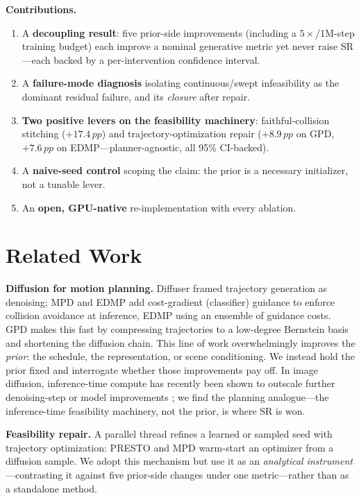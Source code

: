 \documentclass[10pt,twocolumn]{article}
\newcommand{\pp}{\,pp}
\begin{document}
\noindent\textbf{Contributions.}
\begin{enumerate}\itemsep2pt
\item A \textbf{decoupling result}: five prior-side improvements (including a
  $5\times$/1M-step training budget) each improve a nominal generative metric yet
  never raise SR---each backed by a per-intervention confidence interval.
\item A \textbf{failure-mode diagnosis} isolating continuous/swept infeasibility as
  the dominant residual failure, and its \emph{closure} after repair.
\item \textbf{Two positive levers on the feasibility machinery}: faithful-collision
  stitching ($+17.4\pp$) and trajectory-optimization repair ($+8.9\pp$ on GPD,
  $+7.6\pp$ on EDMP---planner-agnostic, all 95\% CI-backed).
\item A \textbf{naive-seed control} scoping the claim: the prior is a necessary
  initializer, not a tunable lever.
\item An \textbf{open, GPU-native} re-implementation with every ablation.
\end{enumerate}

\section{Related Work}
\textbf{Diffusion for motion planning.} Diffuser \cite{diffuser2022} framed
trajectory generation as denoising; MPD \cite{mpd2023} and EDMP \cite{edmp2024}
add cost-gradient (classifier) guidance to enforce collision avoidance at
inference, EDMP using an ensemble of guidance costs. GPD \cite{gpd2025} makes this
fast by compressing trajectories to a low-degree Bernstein basis and shortening the
diffusion chain. This line of work overwhelmingly improves the \emph{prior}: the
schedule, the representation, or scene conditioning. We instead hold the prior
fixed and interrogate whether those improvements pay off. In image diffusion,
inference-time compute has recently been shown to outscale further denoising-step or
model improvements \cite{inftimescale2025}; we find the planning analogue---the
inference-time feasibility machinery, not the prior, is where SR is won.

\noindent\textbf{Feasibility repair.} A parallel thread refines a learned or sampled
seed with trajectory optimization: PRESTO \cite{presto2025} and MPD
\cite{mpd2023} warm-start an optimizer from a diffusion sample. We adopt this
mechanism but use it as an \emph{analytical instrument}---contrasting it against
five prior-side changes under one metric---rather than as a standalone method.
\end{document}
